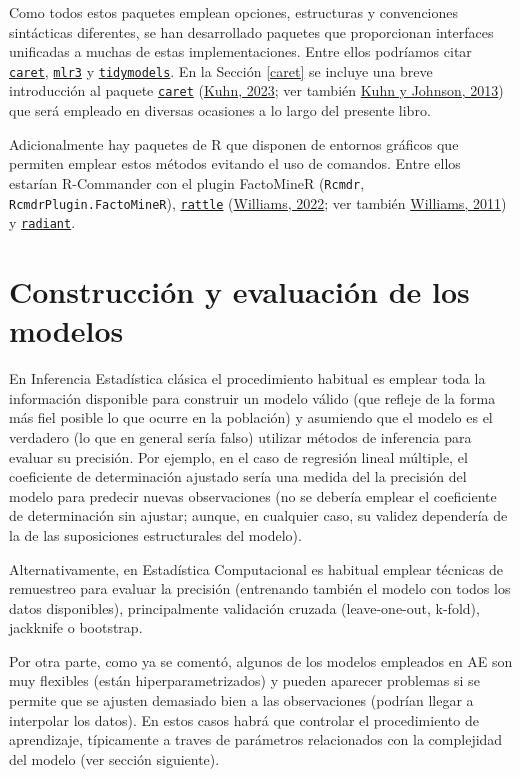 \documentclass[
]{book}
\theoremstyle{break}
\theoremstyle{nonumberplain}
\begin{document}
Como todos estos paquetes emplean opciones, estructuras y convenciones sintácticas diferentes, se han desarrollado paquetes que proporcionan interfaces unificadas a muchas de estas implementaciones.
Entre ellos podríamos citar \href{https://topepo.github.io/caret}{\texttt{caret}}, \href{https://mlr3.mlr-org.com}{\texttt{mlr3}} y \href{https://www.tidymodels.org}{\texttt{tidymodels}}.
En la Sección \ref{caret} se incluye una breve introducción al paquete \href{https://topepo.github.io/caret}{\texttt{caret}} (\protect\hyperlink{ref-R-caret}{Kuhn, 2023}; ver también \protect\hyperlink{ref-kuhn2013applied}{Kuhn y Johnson, 2013}) que será empleado en diversas ocasiones a lo largo del presente libro.

Adicionalmente hay paquetes de R que disponen de entornos gráficos que permiten emplear estos métodos evitando el uso de comandos.
Entre ellos estarían R-Commander con el plugin FactoMineR (\texttt{Rcmdr}, \texttt{RcmdrPlugin.FactoMineR}), \href{https://rattle.togaware.com}{\texttt{rattle}} (\protect\hyperlink{ref-R-rattle}{Williams, 2022}; ver también \protect\hyperlink{ref-williams2011data}{Williams, 2011}) y \href{https://github.com/radiant-rstats/radiant}{\texttt{radiant}}.

\hypertarget{const-eval}{%
\section{Construcción y evaluación de los modelos}\label{const-eval}}

En Inferencia Estadística clásica el procedimiento habitual es emplear toda la información disponible para construir un modelo válido (que refleje de la forma más fiel posible lo que ocurre en la población) y asumiendo que el modelo es el verdadero (lo que en general sería falso) utilizar métodos de inferencia para evaluar su precisión.
Por ejemplo, en el caso de regresión lineal múltiple, el coeficiente de determinación ajustado sería una medida del la precisión del modelo para predecir nuevas observaciones (no se debería emplear el coeficiente de determinación sin ajustar; aunque, en cualquier caso, su validez dependería de la de las suposiciones estructurales del modelo).

Alternativamente, en Estadística Computacional es habitual emplear técnicas de remuestreo para evaluar la precisión (entrenando también el modelo con todos los datos disponibles), principalmente validación cruzada (leave-one-out, k-fold), jackknife o bootstrap.

Por otra parte, como ya se comentó, algunos de los modelos empleados en AE son muy flexibles (están hiperparametrizados) y pueden aparecer problemas si se permite que se ajusten demasiado bien a las observaciones (podrían llegar a interpolar los datos).
En estos casos habrá que controlar el procedimiento de aprendizaje, típicamente a traves de parámetros relacionados con la complejidad del modelo (ver sección siguiente).
\end{document}
